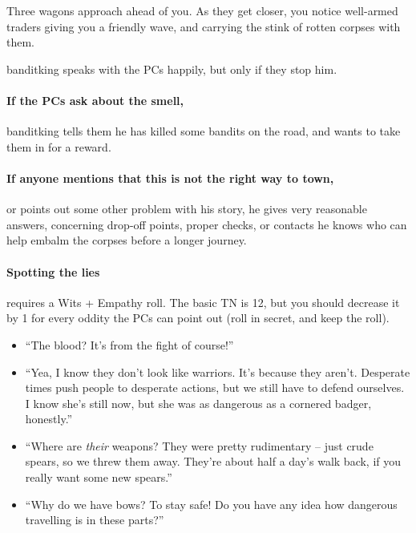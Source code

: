 \begin{multicols}{2}
\begin{boxtext}
  Three wagons approach ahead of you.
  As they get closer, you notice well-armed traders giving you a friendly wave, and carrying the stink of rotten corpses with them.
\end{boxtext}

\Gls{banditking} speaks with the PCs happily, but only if they stop him.

\paragraph{If the PCs ask about the smell,}
\gls{banditking} tells them he has killed some bandits on the road, and wants to take them in for a reward.

\paragraph{If anyone mentions that this is not the right way to \gls{town},}
or points out some other problem with his story, he gives very reasonable answers, concerning drop-off points, proper checks, or contacts he knows who can help embalm the corpses before a longer journey.

\paragraph{Spotting the lies}
requires a Wits + Empathy roll.
The basic TN is 12, but you should decrease it by 1 for every oddity the PCs can point out (roll in secret, and keep the roll).

\begin{itemize}
  \item
  ``The blood? It's from the fight of course!''
  \item
  ``Yea, I know they don't look like warriors.
  It's because they aren't.
  Desperate times push people to desperate actions, but we still have to defend ourselves.
  I know she's still now, but she was as dangerous as a cornered badger, honestly.''
  \item
  ``Where are \emph{their} weapons?
  They were pretty rudimentary -- just crude spears, so we threw them away.
  They're about half a day's walk back, if you really want some new spears.''
  \item
  ``Why do we have bows?
  To stay safe!
  Do you have any idea how dangerous travelling is in these parts?''
\end{itemize}


\end{multicols}
